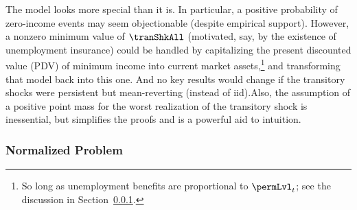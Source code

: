 \documentclass[\econtexRoot/BufferStockTheory]{subfiles}
\begin{document}
The model looks more special than it is.
In particular, a positive probability of zero-income events may seem objectionable (despite empirical support).
However, a nonzero minimum value of $\tranShkAll$ (motivated, say, by the existence of unemployment insurance) could be handled by capitalizing the present discounted value (PDV) of minimum income into current market assets,\footnote{So long as unemployment benefits are proportional to $\permLvl_{t}$; see the discussion in Section~\ref{subsubsec:ratio}.} and transforming that model back into this one.
And no key results would change if the transitory shocks were persistent but mean-reverting (instead of iid).\@ Also, the assumption of a positive point mass for the worst realization of the transitory shock is inessential, but simplifies the proofs and is a powerful aid to intuition.

\hypertarget{The-Problem-Can-Be-Rewritten-in-Ratio-Form}{}
\hypertarget{The-Problem-Can-Be-Normalized-By-Permanent-Income}{}
\subsubsection{Normalized Problem}\label{subsubsec:ratio}
\end{document}

